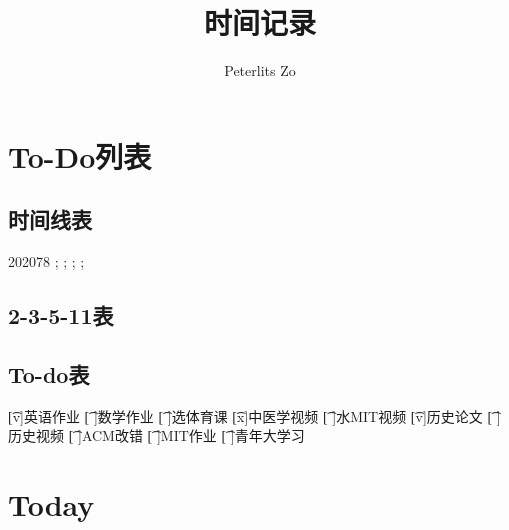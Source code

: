 \documentclass{peterlitsdoc}
\title{时间记录}
\author{Peterlits Zo}
\begin{document}
\maketitle
\tableofcontents
\newpage


\section{To-Do列表}

\subsection{时间线表}

\begin{plttimeline}{2020}{7}{8}
    ;
    ;
    ;
    ;
\end{plttimeline}

\subsection{2-3-5-11表}


\subsection{To-do表}

\begin{plttodoenv}{4}
\t[v]英语作业       \t[ ]数学作业       \t[ ]选体育课       \t[x]中医学视频
\t[ ]水MIT视频      \t[v]历史论文       \t[ ]历史视频       \t[ ]ACM改错
\t[ ]MIT作业        \t[ ]青年大学习
\end{plttodoenv}




\section{Today}
\end{document}
